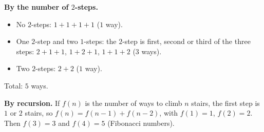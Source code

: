 \textbf{By the number of $2$-steps.}
\begin{itemize}
\item No $2$-steps: $1+1+1+1$ ($1$ way).
\item One $2$-step and two $1$-steps: the $2$-step is first, second or third of the three steps: $2+1+1$, $1+2+1$, $1+1+2$ ($3$ ways).
\item Two $2$-steps: $2+2$ ($1$ way).
\end{itemize}
Total: $\boxed{5}$ ways.

\textbf{By recursion.} If $f(n)$ is the number of ways to climb $n$ stairs, the first step is $1$ or $2$ stairs, so $f(n)=f(n-1)+f(n-2)$, with $f(1)=1$, $f(2)=2$. Then $f(3)=3$ and $f(4)=5$ (Fibonacci numbers).

